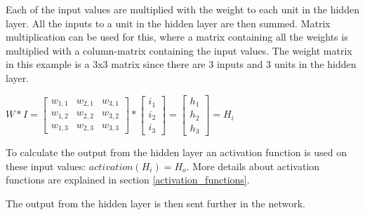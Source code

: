 Each of the input values are multiplied with the weight to each unit in the hidden layer. All the inputs to a unit in the hidden layer are then summed. Matrix multiplication can be used for this, where a matrix containing all the weights is multiplied with a column-matrix containing the input values. The weight matrix in this example is a 3x3 matrix since there are 3 inputs and 3 units in the hidden layer.

\begin{center}
$
W * I = 
\begin{bmatrix} 
w_{1,1} & w_{2,1} & w_{3,1}\\
w_{1,2} & w_{2,2} & w_{3,2}\\
w_{1,3} & w_{2,3} & w_{3,3}
\end{bmatrix}
*
\begin{bmatrix} 
i_1\\
i_2\\
i_3
\end{bmatrix}
=
\begin{bmatrix} 
h_1\\
h_2\\
h_3
\end{bmatrix}
=
H_i
$
\end{center}

To calculate the output from the hidden layer an activation function is used on these input values: $activation(H_i) = H_o$. More details about activation functions are explained in section \ref{activation_functions}.


The output from the hidden layer is then sent further in the network.


